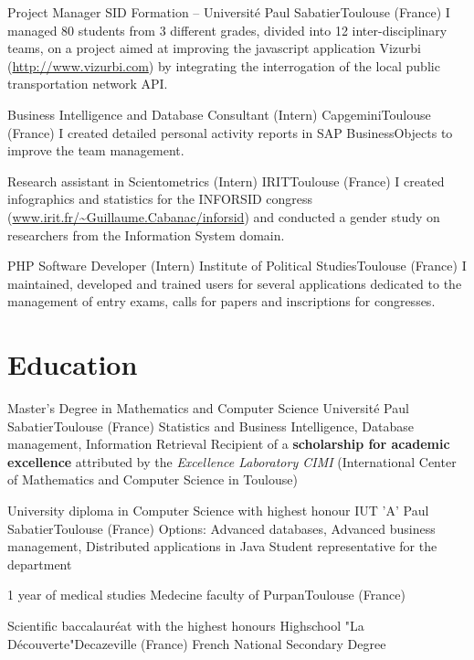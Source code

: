 \documentclass{my_cv_bis}
\begin{document}
	{Project Manager}
	{SID Formation -- Université Paul Sabatier}{Toulouse (France)}{}
	{I managed 80 students from 3 different grades, divided into 12 inter-disciplinary teams, on a project aimed at improving the javascript application Vizurbi (\href{http://www.vizurbi.com}{http://www.vizurbi.com}) by integrating the interrogation of the local public transportation network API.}
	
	{Business Intelligence and Database Consultant{\small\color{gray} (Intern)}}
	{Capgemini}{Toulouse (France)}{}
	{I created detailed personal activity reports in SAP BusinessObjects to improve the team management.}
	
	{Research assistant in Scientometrics {\small\color{gray} (Intern)}}
	{IRIT}{Toulouse (France)}{}
	{I created infographics and statistics for the INFORSID congress (\href{http://www.irit.fr/~Guillaume.Cabanac/inforsid}{www.irit.fr/\~{}Guillaume.Cabanac/inforsid}) and conducted a gender study on researchers from the Information System domain.}

	{PHP Software Developer {\small\color{gray} (Intern)}}
	{Institute of Political Studies}{Toulouse (France)}{}
	{I maintained, developed and trained users for several applications dedicated to the management of entry exams, calls for papers and inscriptions for congresses.}
	
 
\section{Education}
	{Master's Degree in Mathematics and Computer Science}
	{Université Paul Sabatier}{Toulouse (France)}
	{Statistics and Business Intelligence, Database management, Information Retrieval}
	{Recipient of a \textbf{scholarship for academic excellence} attributed by the \textit{Excellence Laboratory CIMI} (International Center of Mathematics and Computer Science in Toulouse)}
	
	{University diploma in Computer Science with highest honour}
	{IUT 'A' Paul Sabatier}{Toulouse (France)}
	{Options: Advanced databases, Advanced business management, Distributed applications in Java}
	{Student representative for the department}
	
	{1 year of medical studies}
	{Medecine faculty of Purpan}{Toulouse (France)}
	{}{}
	
	{Scientific baccalauréat with the highest honours}
	{Highschool "La Découverte"}{Decazeville (France)}
	{French National Secondary Degree}{}
	
\end{document}
